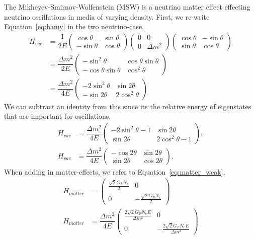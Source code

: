 \documentclass[main.tex]{subfiles}
\begin{document}
The Mikheyev-Smirnov-Wolfenstein (MSW) is a neutrino matter effect effecting neutrino oscillations in media of varying density. 
First, we re-write Equation~\eqref{eq:hamy} in the two neutrino-case. 
\begin{align}
    H_{vac} &= \dfrac{1}{2E}\left(\begin{array}{cc}\cos\theta &\sin\theta \\ -\sin\theta & \cos\theta\end{array}\right)\left(\begin{array}{cc}0 & 0 \\ 0 & \Delta m^{2}\end{array}\right) \left(\begin{array}{cc}\cos\theta &-\sin\theta \\ \sin\theta & \cos\theta\end{array}\right) \\
    &= \dfrac{\Delta m^{2}}{2E}\left(\begin{array}{cc} -\sin^{2}\theta & \cos\theta\sin\theta \\ -\cos\theta \sin\theta & \cos^{2}\theta\end{array}\right)\\
    &= \dfrac{\Delta m^{2}}{4E}\left(\begin{array}{cc} -2\sin^{2}\theta & \sin 2\theta \\ -\sin 2\theta & 2\cos^{2}\theta\end{array}\right)
\end{align}
We can subtract an identity from this since its the relative energy of eigenstates that are important for oscillations,
\begin{align}
    H_{vac}  &= \dfrac{\Delta m^{2}}{4E}\left(\begin{array}{cc} -2\sin^{2}\theta-1 & \sin 2\theta \\ \sin 2\theta & 2\cos^{2}\theta -1\end{array}\right),\\
    H_{vac} &= \dfrac{\Delta m^{2}}{4E}\left(\begin{array}{cc} -\cos 2\theta & \sin 2\theta \\ \sin 2\theta & \cos 2\theta \end{array}\right). \label{eq:vacuum_msw}
\end{align}
When adding in matter-effects, we refer to Equation~\eqref{eq:matter_weak},
\begin{align}
    H_{matter} &= \left(\begin{array}{cc} \tfrac{\sqrt{2}G_{F}N_{e}}{2} & 0 \\ 0 & -\tfrac{\sqrt{2}G_{F}N_{e}}{2} \end{array}\right)\\
    H_{matter} &= \dfrac{\Delta m^{2}}{4E}\left(\begin{array}{cc} \tfrac{2\sqrt{2}G_{F}N_{e}E}{\Delta m^{2}} & 0 \\ 0 & - \tfrac{2\sqrt{2}G_{F}N_{e}E}{\Delta m^{2}} \end{array}\right) \label{eq:matter_only}
\end{align}
\end{document}
